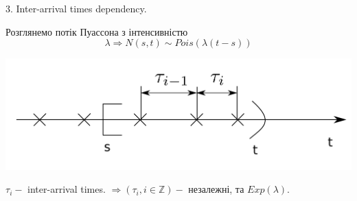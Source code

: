 \documentclass[fontsize=14pt,a4paper]{scrartcl}
\theoremstyle{definition}
\theoremstyle{remark}
\theoremstyle{definition}
\theoremstyle{definition}
\begin{document}
3. Inter-arrival times dependency.
\begin{boxteo}
Розглянемо потік Пуассона з інтенсивністю
 $$\lambda \Rightarrow  N(s,t) \sim Pois(\lambda(t-s)) $$
\begin{center} \includegraphics[scale=0.3]{images/4.png} \end{center}
$\tau_i - $ inter-arrival times.
 $ \Rightarrow\left( \tau_i , i \in \mathbb{Z} \right) - $ незалежні, та $Exp(\lambda).$
\end{boxteo}
\end{document}
